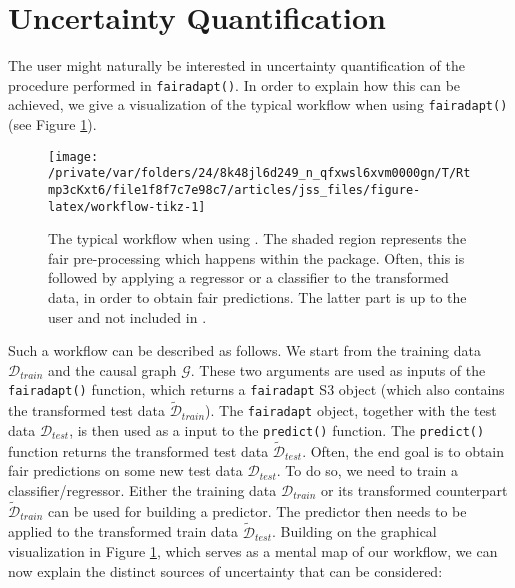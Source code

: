 \documentclass[
  nojss]{jss}
\begin{document}
\hypertarget{sec:uncq}{%
\section{Uncertainty Quantification}\label{sec:uncq}}

The user might naturally be interested in uncertainty quantification of
the procedure performed in \texttt{fairadapt()}. In order to explain how
this can be achieved, we give a visualization of the typical workflow
when using \texttt{fairadapt()} (see Figure \ref{fig:workflow-tikz}).

\begin{CodeChunk}
\begin{figure}

{\centering \texttt{[image: /private/var/folders/24/8k48jl6d249\_n\_qfxwsl6xvm0000gn/T/Rtmp3cKxt6/file1f8f7c7e98c7/articles/jss\_files/figure-latex/workflow-tikz-1]} 

}

\caption{The typical workflow when using . The shaded region represents the fair pre-processing which happens within the  package. Often, this is followed by applying a regressor or a classifier to the transformed data, in order to obtain fair predictions. The latter part is up to the user and not included in .}\label{fig:workflow-tikz}
\end{figure}
\end{CodeChunk}

Such a workflow can be described as follows. We start from the training
data \(\mathcal{D}_{train}\) and the causal graph \(\mathcal{G}\). These
two arguments are used as inputs of the \texttt{fairadapt()} function,
which returns a \texttt{fairadapt} S3 object (which also contains the
transformed test data \(\widetilde{\mathcal{D}}_{train}\)). The
\texttt{fairadapt} object, together with the test data
\(\mathcal{D}_{test}\), is then used as a input to the
\texttt{predict()} function. The \texttt{predict()} function returns the
transformed test data \(\widetilde{\mathcal{D}}_{test}\). Often, the end
goal is to obtain fair predictions on some new test data
\({\mathcal{D}}_{test}\). To do so, we need to train a
classifier/regressor. Either the training data \(\mathcal{D}_{train}\)
or its transformed counterpart \(\widetilde{\mathcal{D}}_{train}\) can
be used for building a predictor. The predictor then needs to be applied
to the transformed train data \(\widetilde{\mathcal{D}}_{test}\).
Building on the graphical visualization in Figure
\ref{fig:workflow-tikz}, which serves as a mental map of our workflow,
we can now explain the distinct sources of uncertainty that can be
considered:
\end{document}

